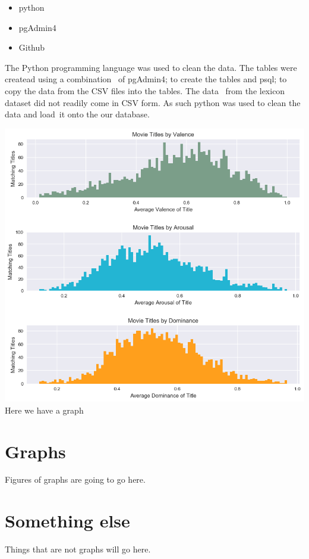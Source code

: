 \documentclass[12pt,a4paper]{article}
\begin{document}
    \begin{itemize}
        \item python
        \item pgAdmin4
        \item Github
    \end{itemize}
    The Python programming language was used to clean the data. The tables were createad using a combination \
    of pgAdmin4; to create the tables and psql; to copy the data from the CSV files into the tables. The data \
    from the lexicon dataset did not readily come in CSV form.  As such python was used to clean the data and load\
    it onto the our database.

    \centering
    \includegraphics[scale=0.8]{Movie_titles_by_vad}
    Here we have a graph

    \begin{appendices}
        \section{Graphs}
        Figures of graphs are going to go here.
        \section{Something else}
        Things that are not graphs will go here.
    \end{appendices}
\end{document}
